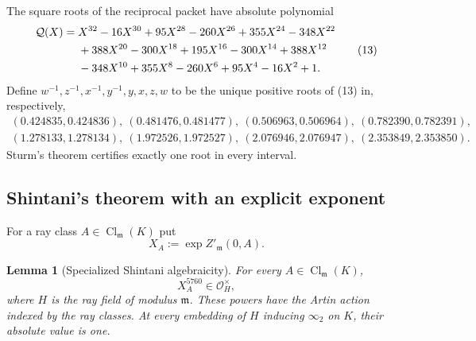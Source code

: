 \documentclass[11pt]{article}
\newtheorem{lemma}[theorem]{Lemma}
\newcommand{\Cl}{\operatorname{Cl}}
\begin{document}
The square roots of the reciprocal packet have absolute polynomial
\[
\begin{aligned}
{\cal Q}(X)={}&X^{32}-16X^{30}+95X^{28}-260X^{26}+355X^{24}
-348X^{22}\\
&+388X^{20}-300X^{18}+195X^{16}-300X^{14}+388X^{12}\\
&-348X^{10}+355X^8-260X^6+95X^4-16X^2+1.
\end{aligned}
\tag{13}
\]
Define $w^{-1},z^{-1},x^{-1},y^{-1},y,x,z,w$ to be the unique
positive roots of (13) in, respectively,
\[
\begin{gathered}
(0.424835,0.424836),\ (0.481476,0.481477),\
(0.506963,0.506964),\ (0.782390,0.782391),\\
(1.278133,1.278134),\ (1.972526,1.972527),\
(2.076946,2.076947),\ (2.353849,2.353850).
\end{gathered}
\tag{14}
\]
Sturm's theorem certifies exactly one root in every interval.

\subsection{Shintani's theorem with an explicit exponent}

For a ray class $A\in\Cl_{\mathfrak m}(K)$ put
\[
 X_A:=\exp Z'_{\mathfrak m}(0,A).
\]

\begin{lemma}[Specialized Shintani algebraicity]\label{lem:shintani}
For every $A\in\Cl_{\mathfrak m}(K)$,
\[
 X_A^{5760}\in\mathcal O_H^\times,
\]
where $H$ is the ray field of modulus $\mathfrak m$.  These powers have
the Artin action indexed by the ray classes.  At every embedding of
$H$ inducing $\infty_2$ on $K$, their absolute value is one.
\end{lemma}
\end{document}
